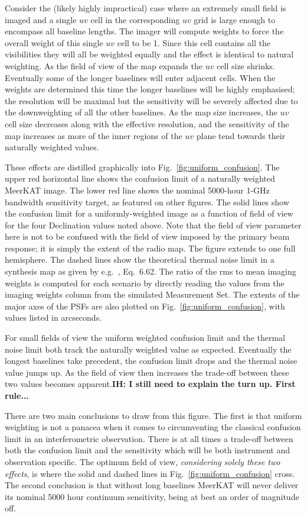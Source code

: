 \documentclass{aa}
\begin{document}
Consider the (likely highly impractical) case where an extremely small field is imaged and a single $uv$ cell in the corresponding $uv$ grid is large enough to encompass all baseline lengths. The imager will compute weights to force the overall weight of this single $uv$ cell to be 1. Since this cell contains all the visibilities they will all be weighted equally and the effect is identical to natural weighting. As the field of view of the map expands the $uv$ cell size shrinks. Eventually some of the longer baselines will enter adjacent cells. When the weights are determined this time the longer baselines will be highly emphasised; the resolution will be maximal but the sensitivity will be severely affected due to the downweighting of all the other baselines. As the map size increases, the $uv$ cell size decreases along with the effective resolution, and the sensitivity of the map increases as more of the inner regions of the $uv$ plane tend towards their naturally weighted values.

These effects are distilled graphically into Fig.~\ref{fig:uniform_confusion}. The upper red horizontal line shows the confusion limit of a naturally weighted MeerKAT image. The lower red line shows the nominal 5000-hour 1-GHz bandwidth sensitivity target, as featured on other figures. The solid lines show the confusion limit for a uniformly-weighted image as a function of field of view for the four Declination values noted above. Note that the field of view parameter here is not to be confused with the field of view imposed by the primary beam response; it is simply the extent of the radio map. The figure extends to one full hemisphere. The dashed lines show the theoretical thermal noise limit in a synthesis map as given by e.g.~\citet{tms1}, Eq.~6.62. The ratio of the rms to mean imaging weights is computed for each scenario by directly reading the values from the imaging weights column from the simulated Measurement Set. The extents of the major axes of the PSFs are also plotted on Fig.~\ref{fig:uniform_confusion}, with values listed in arcseconds.

For small fields of view the uniform weighted confusion limit and the thermal noise limit both track the naturally weighted value as expected. Eventually the longest baselines take precedent, the confusion limit drops and the thermal noise value jumps up. As the field of view then increases the trade-off between these two values becomes apparent.{\bf IH: I still need to explain the turn up. First rule...}

There are two main conclusions to draw from this figure. The first is that uniform weighting is not a panacea when it comes to circumventing the classical confusion limit in an interferometric observation. There is at all times a trade-off between both the confusion limit and the sensitivity which will be both instrument and observation specific. The optimum field of view, \emph{considering solely these two effects}, is where the solid and dashed lines in Fig.~\ref{fig:uniform_confusion} cross. The second conclusion is that without long baselines MeerKAT will never deliver its nominal 5000 hour continuum sensitivity, being at best an order of magnitude off.
\end{document}

